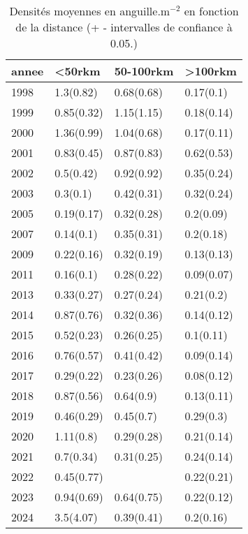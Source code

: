 \begin{table}[htbp]
\centering
\caption[Densité et distance.]{Densités moyennes en anguille.m$^{-2}$ en fonction de la distance (+ - intervalles de confiance à 0.05.)} 
\label{tableau3_dens_dist_annee}
\begin{tabular}{llll}
  \hline
annee & <50rkm & 50-100rkm & >100rkm \\ 
  \hline
1998 & 1.3(0.82) & 0.68(0.68) & 0.17(0.1) \\ 
  1999 & 0.85(0.32) & 1.15(1.15) & 0.18(0.14) \\ 
  2000 & 1.36(0.99) & 1.04(0.68) & 0.17(0.11) \\ 
  2001 & 0.83(0.45) & 0.87(0.83) & 0.62(0.53) \\ 
  2002 & 0.5(0.42) & 0.92(0.92) & 0.35(0.24) \\ 
  2003 & 0.3(0.1) & 0.42(0.31) & 0.32(0.24) \\ 
  2005 & 0.19(0.17) & 0.32(0.28) & 0.2(0.09) \\ 
  2007 & 0.14(0.1) & 0.35(0.31) & 0.2(0.18) \\ 
  2009 & 0.22(0.16) & 0.32(0.19) & 0.13(0.13) \\ 
  2011 & 0.16(0.1) & 0.28(0.22) & 0.09(0.07) \\ 
  2013 & 0.33(0.27) & 0.27(0.24) & 0.21(0.2) \\ 
  2014 & 0.87(0.76) & 0.32(0.36) & 0.14(0.12) \\ 
  2015 & 0.52(0.23) & 0.26(0.25) & 0.1(0.11) \\ 
  2016 & 0.76(0.57) & 0.41(0.42) & 0.09(0.14) \\ 
  2017 & 0.29(0.22) & 0.23(0.26) & 0.08(0.12) \\ 
  2018 & 0.87(0.56) & 0.64(0.9) & 0.13(0.11) \\ 
  2019 & 0.46(0.29) & 0.45(0.7) & 0.29(0.3) \\ 
  2020 & 1.11(0.8) & 0.29(0.28) & 0.21(0.14) \\ 
  2021 & 0.7(0.34) & 0.31(0.25) & 0.24(0.14) \\ 
  2022 & 0.45(0.77) &  & 0.22(0.21) \\ 
  2023 & 0.94(0.69) & 0.64(0.75) & 0.22(0.12) \\ 
  2024 & 3.5(4.07) & 0.39(0.41) & 0.2(0.16) \\ 
   \hline
\end{tabular}
\end{table}
